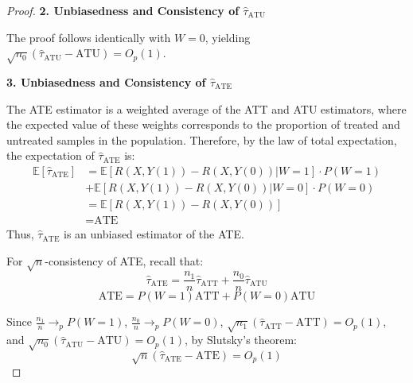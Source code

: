 \documentclass{article}
\theoremstyle{definition}
\newcommand{\EE}{\mathbb{E}}
\begin{document}
\begin{proof}
  \newpage
  \textbf{2. Unbiasedness and Consistency of $\hat{\tau}_{\text{ATU}}$}
  
  The proof follows identically with $W = 0$, yielding $\sqrt{n_0}(\hat{\tau}_{\text{ATU}} - \text{ATU}) = O_p(1)$.
  
  \textbf{3. Unbiasedness and Consistency of $\hat{\tau}_{\text{ATE}}$}
  
  The ATE estimator is a weighted average of the ATT and ATU estimators, where the expected value of these weights corresponds to the proportion of treated and untreated samples in the population. Therefore, by the law of total expectation, the expectation of $\hat{\tau}_{\text{ATE}}$ is:
  \begin{align*}
  \EE[\hat{\tau}_{\text{ATE}}] &= \EE[R(X, Y(1)) - R(X, Y(0)) | W = 1] \cdot P(W = 1) \\
  &+ \EE[R(X, Y(1)) - R(X, Y(0)) | W = 0] \cdot P(W = 0) \\
  &= \EE[R(X, Y(1)) - R(X, Y(0))] \\
  &= \text{ATE}
  \end{align*}
  Thus, $\hat{\tau}_{\text{ATE}}$ is an unbiased estimator of the ATE.

  For $\sqrt{n}$-consistency of ATE, recall that:
\[\hat{\tau}_{\text{ATE}} = \frac{n_1}{n}\hat{\tau}_{\text{ATT}} + \frac{n_0}{n}\hat{\tau}_{\text{ATU}}\]
\[\text{ATE} = P(W=1)\text{ATT} + P(W=0)\text{ATU}\]

  Since $\frac{n_1}{n} \to_p P(W=1)$, $\frac{n_0}{n} \to_p P(W=0)$, $\sqrt{n_1}(\hat{\tau}_{\text{ATT}} - \text{ATT}) = O_p(1)$, and $\sqrt{n_0}(\hat{\tau}_{\text{ATU}} - \text{ATU}) = O_p(1)$, by Slutsky's theorem:
  \[\sqrt{n}(\hat{\tau}_{\text{ATE}} - \text{ATE}) = O_p(1)\]
\end{proof}
\end{document}
